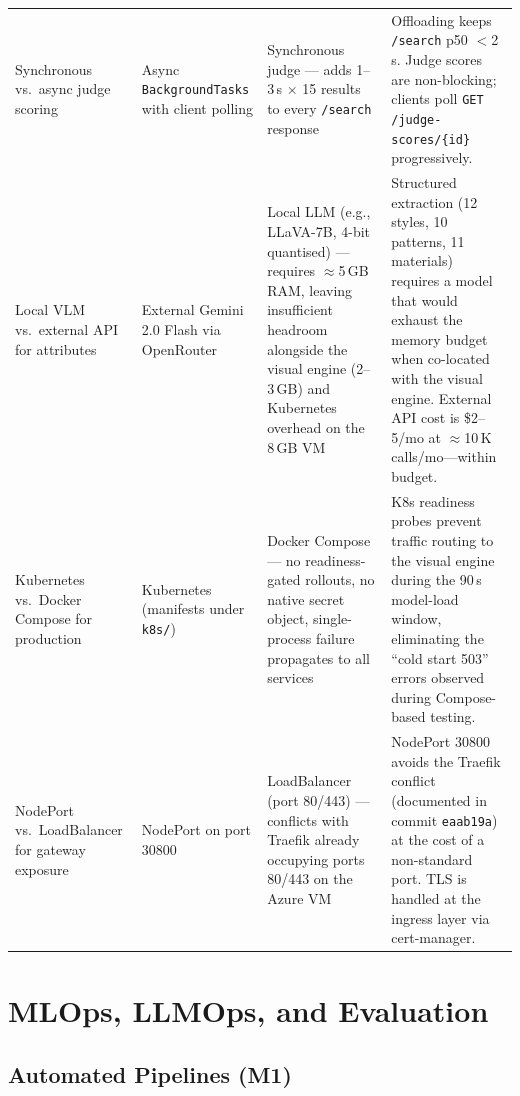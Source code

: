 \documentclass[12pt]{article}
\begin{document}
\begin{longtable}{@{}>{\RaggedRight\arraybackslash}p{2.6cm}>{\RaggedRight\arraybackslash}p{2.8cm}>{\RaggedRight\arraybackslash}p{3.0cm}>{\RaggedRight\arraybackslash}p{4.6cm}@{}}
Synchronous vs.\ async judge scoring &
Async \texttt{BackgroundTasks} with client polling &
Synchronous judge --- adds 1--3\,s $\times$ 15 results to every \texttt{/search} response &
Offloading keeps \texttt{/search} p50 $<$2\,s. Judge scores are non-blocking; clients poll \texttt{GET /judge-scores/\{id\}} progressively. \\[4pt]

Local VLM vs.\ external API for attributes &
External Gemini 2.0 Flash via OpenRouter &
Local LLM (e.g., LLaVA-7B, 4-bit quantised) --- requires $\approx$5\,GB RAM, leaving insufficient headroom alongside the visual engine (2--3\,GB) and Kubernetes overhead on the 8\,GB VM &
Structured extraction (12 styles, 10 patterns, 11 materials) requires a model that would exhaust the memory budget when co-located with the visual engine. External API cost is \$2--5/mo at $\approx$10\,K calls/mo---within budget. \\[4pt]

Kubernetes vs.\ Docker Compose for production &
Kubernetes (manifests under \texttt{k8s/}) &
Docker Compose --- no readiness-gated rollouts, no native secret object, single-process failure propagates to all services &
K8s readiness probes prevent traffic routing to the visual engine during the 90\,s model-load window, eliminating the ``cold start 503'' errors observed during Compose-based testing. \\[4pt]

NodePort vs.\ LoadBalancer for gateway exposure &
NodePort on port 30800 &
LoadBalancer (port 80/443) --- conflicts with Traefik already occupying ports 80/443 on the Azure VM &
NodePort 30800 avoids the Traefik conflict (documented in commit \texttt{eaab19a}) at the cost of a non-standard port. TLS is handled at the ingress layer via cert-manager.

\end{longtable}

\section{MLOps, LLMOps, and Evaluation}

\subsection{Automated Pipelines (M1)}
\end{document}
